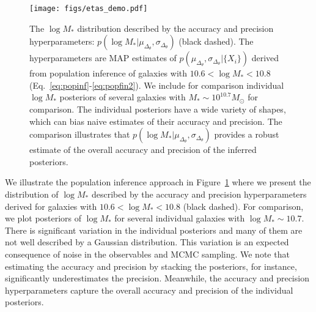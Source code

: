 \begin{figure}
\begin{center}
\texttt{[image: figs/etas\_demo.pdf]}
    \caption{
    The $\log M_*$ distribution described by the accuracy and precision
    hyperparameters: $p(\log M_* | \mu_{\Delta_\theta},
    \sigma_{\Delta_\theta})$ (black dashed).
    The hyperparameters are MAP estimates of $p( \mu_{\Delta_\theta}, 
    \sigma_{\Delta_\theta} | \{ X_i \})$ derived from population inference of
    galaxies with $10.6 < \log M_* < 10.8$
    (Eq.~\ref{eq:popinf}-\ref{eq:popfin2}). 
    We include for comparison individual $\log M_*$ posteriors of several
    galaxies with $M_* \sim 10^{10.7} M_\odot$ for comparison.   
    The individual posteriors have a wide variety of shapes, which can bias 
    naive estimates of their accuracy and precision. 
    The comparison illustrates that 
    $p(\log M_* | \mu_{\Delta_\theta}, \sigma_{\Delta_\theta})$ provides a
    robust estimate of the overall accuracy and precision of the inferred
    posteriors. 
    }\label{fig:eta_demo}
\end{center}
\end{figure}
We illustrate the population inference approach in Figure~\ref{fig:eta_demo} 
where we present the distribution of $\log M_*$ described by the accuracy and
precision hyperparameters derived for galaxies with $10.6 < \log M_* < 10.8$
(black dashed). 
For comparison, we plot posteriors of $\log M_*$ for several individual
galaxies with $\log M_* \sim 10.7$.  
There is significant variation in the individual posteriors and many of them
are not well described by a Gaussian distribution. 
This variation is an expected consequence of noise in the observables and
MCMC sampling.  
We note that estimating the accuracy and precision by stacking the posteriors,
for instance, significantly underestimates the precision.  
Meanwhile, the accuracy and precision hyperparameters capture the overall
accuracy and precision of the individual posteriors. 
